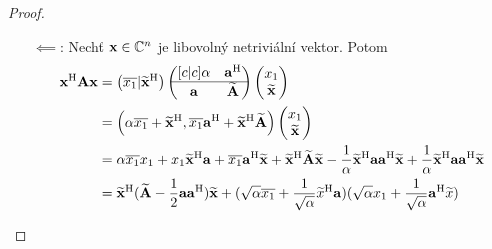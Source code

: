 \begin{proof}
    \leavevmode
    \begin{itemize}
        \item[$\impliedby$:] Nechť $\mathbf{x} \in \mathbb{C}^n$ je libovolný netriviální
            vektor. Potom
            \begin{align*}
                \mathbf{x}^{\mathrm{H}} \mathbf{A} \mathbf{x} &= \left(\overline{x_1}|
                    \widetilde{\mathbf{x}}^{\mathrm{H}}\right)
                    \begin{pmatrix}[c|c]
                        \alpha &\mathbf{a}^{\mathrm{H}} \\
                        \hline
                        \mathbf{a} &\mathbf{\widetilde{A}}
                    \end{pmatrix}
                    \begin{pmatrix}x_1\\ \widetilde{\mathbf{x}}\end{pmatrix} \\
                &= \left(\alpha\overline{x_1} + \widetilde{\mathbf{x}}^{\mathrm{H}},
                    \overline{x_1}\mathbf{a}^{\mathrm{H}} + \widetilde{\mathbf{x}}^{\mathrm{H}}\mathbf{\widetilde{A}}\right)
                    \begin{pmatrix}x_1\\\widetilde{\mathbf{x}}\end{pmatrix} \\
                &= \alpha\overline{x_1}x_1 + x_1\widetilde{\mathbf{x}}^{\mathrm{H}}\mathbf{a} +
                    \overline{x_1}\mathbf{a}^{\mathrm{H}}\widetilde{\mathbf{x}} 
                    + \widetilde{\mathbf{x}}^{\mathrm{H}}\mathbf{\widetilde{A}}\widetilde{\mathbf{x}} 
                    - \frac{1}{\alpha}\widetilde{\mathbf{x}}^{\mathrm{H}}\mathbf{a}\mathbf{a}^{\mathrm{H}}\widetilde{\mathbf{x}}
                    + \frac{1}{\alpha}\widetilde{\mathbf{x}}^{\mathrm{H}}\mathbf{a}\mathbf{a}^{\mathrm{H}}\widetilde{\mathbf{x}} \\
                &= \widetilde{\mathbf{x}}^{\mathrm{H}} (\mathbf{\widetilde{A}} - \frac{1}{2}\mathbf{a}\mathbf{a}^{\mathrm{H}})\widetilde{\mathbf{x}}
                    + (\sqrt{\alpha}\overline{x_1} + \frac{1}{\sqrt{\alpha}}\widetilde{x}^{\mathrm{H}}\mathbf{a})
                    (\sqrt{\alpha}x_1 + \frac{1}{\sqrt{\alpha}}\mathbf{a}^{\mathrm{H}}\widetilde{x})
            \end{align*}


\end{itemize}
\end{proof}

